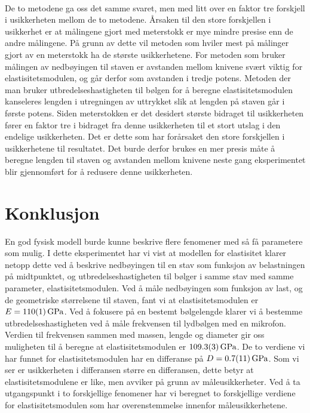 \documentclass[%
 reprint,
 amsmath,amssymb,
 aps,
 norsk,
 booktabs
]{revtex4-1}
\begin{document}
\\De to metodene ga oss det samme svaret, men med litt over en faktor tre forskjell i usikkerheten mellom de to metodene. Årsaken til den store forskjellen i usikkerhet er at målingene gjort med meterstokk er mye mindre presise enn de andre målingene. På grunn av dette vil metoden som hviler mest på målinger gjort av en meterstokk ha de største usikkerhetene. For metoden som bruker målingen av nedbøyingen til staven er avstanden mellom knivene svært viktig for elastisitetsmodulen, og går derfor som avstanden i tredje potens. Metoden der man bruker utbredelseshastigheten til bølgen for å beregne elastisitetsmodulen kanseleres lengden i utregningen av uttrykket slik at lengden på staven går i første potens. Siden meterstokken er det desidert største bidraget til usikkerheten fører en faktor tre i bidraget fra denne usikkerheten til et stort utslag i den endelige usikkerheten. Det er dette som har forårsaket den store forskjellen i usikkerhetene til resultatet. Det burde derfor brukes en mer presis måte å beregne lengden til staven og avstanden mellom knivene neste gang eksperimentet blir gjennomført for å redusere denne usikkerheten.
\section{Konklusjon}
En god fysisk modell burde kunne beskrive flere fenomener med så få parametere som mulig. I dette eksperimentet har vi vist at modellen for elastisitet klarer netopp dette ved å beskrive nedbøyingen til en stav som funksjon av belastningen på midtpunktet, og utbredelseshastigheten til bølger i samme stav med samme parameter, elastisitetsmodulen.
Ved å måle nedbøyingen som funksjon av last, og de geometriske størrelsene til staven, fant vi at elastisitetsmodulen er $E=\SI{110\pm1}{\giga\pascal}$.
Ved å fokusere på en bestemt bølgelengde klarer vi å bestemme utbredelseshastigheten ved å måle frekvensen til lydbølgen med en mikrofon. Verdien til frekvensen sammen med massen, lengde og diameter gir oss muligheten til å beregne at elastisitetsmodulen er $\SI{109.3\pm0.3}{\giga\pascal}$.
De to verdiene vi har funnet for elastisitetsmodulen har en differanse på $D = \SI{0.7\pm1.1}{\giga\pascal}$. Som vi ser er usikkerheten i differansen større en differansen, dette betyr at elastisitetsmodulene er like, men avviker på grunn av måleusikkerheter. Ved å ta utgangspunkt i to forskjellige fenomener har vi beregnet to forskjellige verdiene for elastisitetsmodulen som har overenstemmelse innenfor måleusikkerhetene.
\end{document}
